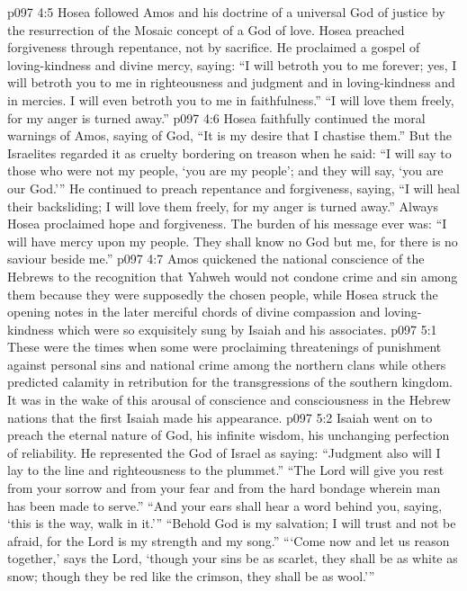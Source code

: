 \vs p097 4:5 \pc Hosea followed Amos and his doctrine of a universal God of justice by the resurrection of the Mosaic concept of a God of love. Hosea preached forgiveness through repentance, not by sacrifice. He proclaimed a gospel of loving\hyp{}kindness and divine mercy, saying: “I will betroth you to me forever; yes, I will betroth you to me in righteousness and judgment and in loving\hyp{}kindness and in mercies. I will even betroth you to me in faithfulness.” “I will love them freely, for my anger is turned away.”
\vs p097 4:6 Hosea faithfully continued the moral warnings of Amos, saying of God, “It is my desire that I chastise them.” But the Israelites regarded it as cruelty bordering on treason when he said: “I will say to those who were not my people, ‘you are my people’; and they will say, ‘you are our God.’” He continued to preach repentance and forgiveness, saying, “I will heal their backsliding; I will love them freely, for my anger is turned away.” Always Hosea proclaimed hope and forgiveness. The burden of his message ever was: “I will have mercy upon my people. They shall know no God but me, for there is no saviour beside me.”
\vs p097 4:7 \pc Amos quickened the national conscience of the Hebrews to the recognition that Yahweh would not condone crime and sin among them because they were supposedly the chosen people, while Hosea struck the opening notes in the later merciful chords of divine compassion and loving\hyp{}kindness which were so exquisitely sung by Isaiah and his associates.
\vs p097 5:1 These were the times when some were proclaiming threatenings of punishment against personal sins and national crime among the northern clans while others predicted calamity in retribution for the transgressions of the southern kingdom. It was in the wake of this arousal of conscience and consciousness in the Hebrew nations that the first Isaiah made his appearance.
\vs p097 5:2 Isaiah went on to preach the eternal nature of God, his infinite wisdom, his unchanging perfection of reliability. He represented the God of Israel as saying: “Judgment also will I lay to the line and righteousness to the plummet.” “The Lord will give you rest from your sorrow and from your fear and from the hard bondage wherein man has been made to serve.” “And your ears shall hear a word behind you, saying, ‘this is the way, walk in it.’” “Behold God is my salvation; I will trust and not be afraid, for the Lord is my strength and my song.” “‘Come now and let us reason together,’ says the Lord, ‘though your sins be as scarlet, they shall be as white as snow; though they be red like the crimson, they shall be as wool.’”
